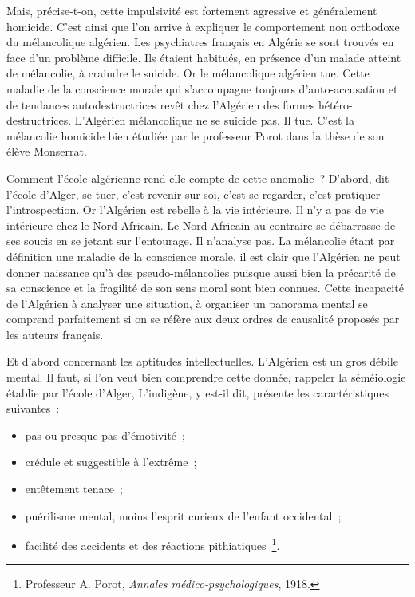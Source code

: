 \documentclass[french,twoside]{book} %
\begin{document}
 Mais, précise-t-on, cette impulsivité est fortement agressive et généralement homicide. C’est ainsi que l’on arrive à expliquer le comportement non orthodoxe du mélancolique algérien. Les psychiatres français en Algérie se sont trouvés en face d’un problème difficile. Ils étaient habitués, en présence d’un malade atteint de mélancolie, à craindre le suicide. Or le mélancolique algérien tue. Cette maladie de la conscience morale qui s’accompagne toujours d’auto-accusation et de tendances autodestructrices revêt chez l’Algérien des formes hétéro-destructrices. L’Algérien mélancolique ne se suicide pas. Il tue. C’est la mélancolie homicide bien étudiée par le professeur Porot dans la thèse de son élève Monserrat.\par
Comment l’école algérienne rend-elle compte de cette anomalie ? D’abord, dit l’école d’Alger, se tuer, c’est revenir sur soi, c’est se regarder, c’est pratiquer l’introspection. Or l’Algérien est rebelle à la vie intérieure. Il n’y a pas de vie intérieure chez le Nord-Africain. Le Nord-Africain au contraire se débarrasse de ses soucis en se jetant sur l’entourage. Il n’analyse pas. La mélancolie étant par définition une maladie de la conscience morale, il est clair que l’Algérien ne peut donner naissance qu’à des pseudo-mélancolies puisque aussi bien la précarité de sa conscience et la fragilité de son sens moral sont bien connues. Cette incapacité de l’Algérien à analyser une situation, à organiser un panorama mental se comprend parfaitement si on se réfère aux deux ordres de causalité proposés par les auteurs français.\par
Et d’abord concernant les aptitudes intellectuelles. L’Algérien est un gros débile mental. Il faut, si l’on veut bien comprendre cette donnée, rappeler la séméiologie établie par l’école d’Alger, L’indigène, y est-il dit, présente les caractéristiques suivantes :\par

\begin{itemize}[itemsep=0pt,]
\item pas ou presque pas d’émotivité ;
\item crédule et suggestible à l’extrême ;
\item entêtement tenace ;
\item puérilisme mental, moins l’esprit curieux de l’enfant occidental ;
\item facilité des accidents et des réactions pithiatiques \footnote{Professeur A. Porot, \emph{Annales médico-psychologiques}, 1918.}.
\end{itemize}
\end{document}
